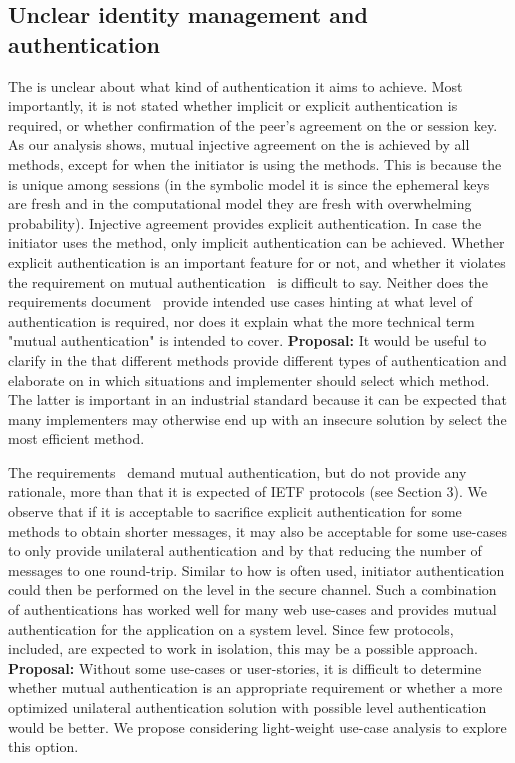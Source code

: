 \documentclass[runningheads,draft]{llncs}
\begin{document}
\subsection{Unclear identity management and authentication}
\label{sec:usableSecurity}
%
The \mSpec{} is unclear about what kind of authentication it aims to achieve.
%
Most importantly, it is not stated whether implicit or explicit authentication
is required, or whether confirmation of the peer's agreement on the \mSid{} or
session key.
%
As our analysis shows, mutual injective agreement on the \mSid{} is achieved
by all methods, except for when the initiator is using the \mStat{} methods.
%
This is because the \mSid{} is unique among sessions (in the symbolic model it
is since the ephemeral keys are fresh and in the computational model they are
fresh with overwhelming probability).
%
Injective agreement provides explicit authentication.
%
In case the initiator uses the \mStat{} method, only implicit authentication
can be achieved.
%
Whether explicit authentication is an important feature for \mEdhoc{} or not, and
whether it violates the requirement on mutual
authentication~\cite{ietf-lake-reqs-04} is difficult to say.
%
Neither does the requirements document~\cite{ietf-lake-reqs-04} provide
intended use cases hinting at what level of authentication is required, nor does
it explain what the more technical term "mutual authentication"
is intended to cover.
%
\textbf{Proposal:}
It would be useful to clarify in the \mSpec{} that different methods provide
different types of authentication and elaborate on in which situations and
implementer should select which method.
%
The latter is important in an industrial standard because it can be expected
that many implementers may otherwise end up with an insecure solution
by select the most efficient method.
%

The requirements~\cite{ietf-lake-reqs-04} demand mutual authentication, but
do not provide any rationale, more than that it is expected of IETF protocols
(see Section 3).
%
We observe that if it is acceptable to sacrifice explicit authentication for
some methods to obtain shorter messages, it may also be acceptable for some
use-cases to only provide unilateral authentication and by that reducing the
number of messages to one round-trip.
%
Similar to how \mTls{} is often used, initiator authentication could then be
performed on the \mCoap{} level in the secure \mOscore{} channel.
%
Such a combination of authentications has worked well for many web
use-cases and provides mutual authentication for the application on a system
level.
%
Since few protocols, \mEdhoc{} included, are expected to work in isolation, this
may be a possible approach.
%
\textbf{Proposal:} Without some use-cases or user-stories, it is difficult to
determine whether mutual authentication is an appropriate requirement or whether
a more optimized unilateral authentication solution with possible \mCoap{} level
authentication would be better.
%
We propose considering light-weight use-case analysis to explore this option.
%
\end{document}
